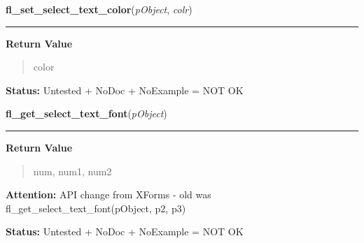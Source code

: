     \vspace{0.5ex}

\hspace{.8\funcindent}\begin{boxedminipage}{\funcwidth}

    \raggedright \textbf{fl\_set\_select\_text\_color}(\textit{pObject}, \textit{colr})

    \vspace{-1.5ex}

    \rule{\textwidth}{0.5\fboxrule}
\setlength{\parskip}{2ex}
\setlength{\parskip}{1ex}
      \textbf{Return Value}
    \vspace{-1ex}

      \begin{quote}
      color

      \end{quote}

\textbf{Status:} Untested + NoDoc + NoExample = NOT OK



    \end{boxedminipage}

    \label{xformslib:library:fl_get_select_text_font}

    \vspace{0.5ex}

\hspace{.8\funcindent}\begin{boxedminipage}{\funcwidth}

    \raggedright \textbf{fl\_get\_select\_text\_font}(\textit{pObject})

    \vspace{-1.5ex}

    \rule{\textwidth}{0.5\fboxrule}
\setlength{\parskip}{2ex}
\setlength{\parskip}{1ex}
      \textbf{Return Value}
    \vspace{-1ex}

      \begin{quote}
      num, num1, num2

      \end{quote}

\textbf{Attention:} API change from XForms - old was fl\_get\_select\_text\_font(pObject, p2, 
p3)



\textbf{Status:} Untested + NoDoc + NoExample = NOT OK



    \end{boxedminipage}

